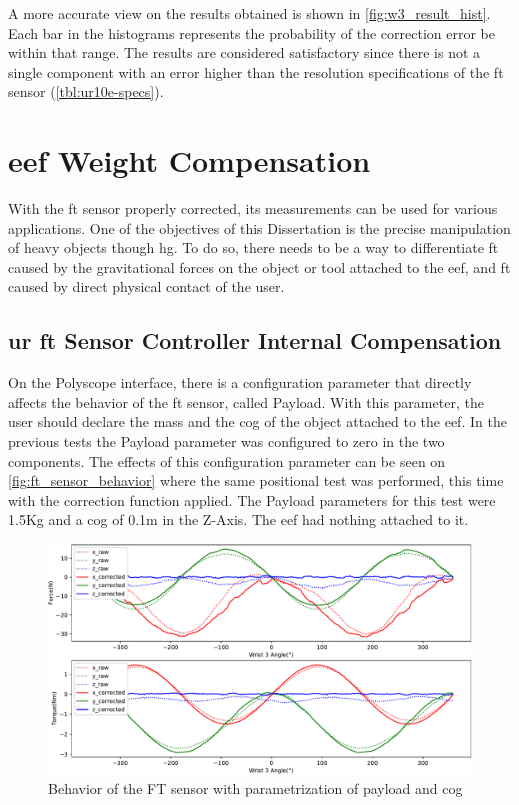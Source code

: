 \par A more accurate view on the results obtained is shown in \autoref{fig:w3_result_hist}. Each bar in the histograms represents the probability of the correction error be within that range. The results are considered satisfactory since there is not a single component with an error higher than the resolution specifications of the \ac{ft} sensor (\autoref{tbl:ur10e-specs}).


\section{\ac{eef} Weight Compensation}

\par With the \ac{ft} sensor properly corrected, its measurements can be used for various applications. One of the objectives of this Dissertation is the precise manipulation of heavy objects though \ac{hg}. To do so, there needs to be a way to differentiate \ac{ft} caused by the gravitational forces on the object or tool attached to the \ac{eef}, and \ac{ft} caused by direct physical contact of the user. 


\subsection{\acs{ur} \acs{ft} Sensor Controller Internal Compensation}
\label{ssec:ft_internal_comp}

\par On the Polyscope interface, there is a configuration parameter that directly affects the behavior of the \ac{ft} sensor, called Payload. With this parameter, the user should declare the mass and the \ac{cog} of the object attached to the \ac{eef}. In the previous tests the Payload parameter was configured to zero in the two components. The effects of this configuration parameter can be seen on \autoref{fig:ft_sensor_behavior} where the same positional test was performed, this time with the correction function applied. The Payload parameters for this test were 1.5Kg and a \ac{cog} of 0.1m in the Z-Axis. The \ac{eef} had nothing attached to it.

\begin{figure}[h]
    \centering
    \includegraphics[width=0.8\linewidth]{figs/chp3/ft_sensor_behavior.pdf}
    \caption{Behavior of the FT sensor with parametrization of payload and cog }
    \label{fig:ft_sensor_behavior}
\end{figure}

